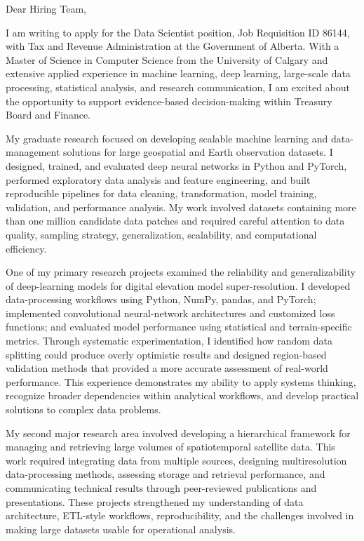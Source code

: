 \documentclass[11pt]{letter}
\begin{document}
\begin{letter}{}

\opening{Dear Hiring Team,}

I am writing to apply for the Data Scientist position, Job Requisition ID 86144, with Tax and Revenue Administration at the Government of Alberta. With a Master of Science in Computer Science from the University of Calgary and extensive applied experience in machine learning, deep learning, large-scale data processing, statistical analysis, and research communication, I am excited about the opportunity to support evidence-based decision-making within Treasury Board and Finance.

My graduate research focused on developing scalable machine learning and data-management solutions for large geospatial and Earth observation datasets. I designed, trained, and evaluated deep neural networks in Python and PyTorch, performed exploratory data analysis and feature engineering, and built reproducible pipelines for data cleaning, transformation, model training, validation, and performance analysis. My work involved datasets containing more than one million candidate data patches and required careful attention to data quality, sampling strategy, generalization, scalability, and computational efficiency.

One of my primary research projects examined the reliability and generalizability of deep-learning models for digital elevation model super-resolution. I developed data-processing workflows using Python, NumPy, pandas, and PyTorch; implemented convolutional neural-network architectures and customized loss functions; and evaluated model performance using statistical and terrain-specific metrics. Through systematic experimentation, I identified how random data splitting could produce overly optimistic results and designed region-based validation methods that provided a more accurate assessment of real-world performance. This experience demonstrates my ability to apply systems thinking, recognize broader dependencies within analytical workflows, and develop practical solutions to complex data problems.

My second major research area involved developing a hierarchical framework for managing and retrieving large volumes of spatiotemporal satellite data. This work required integrating data from multiple sources, designing multiresolution data-processing methods, assessing storage and retrieval performance, and communicating technical results through peer-reviewed publications and presentations. These projects strengthened my understanding of data architecture, ETL-style workflows, reproducibility, and the challenges involved in making large datasets usable for operational analysis.


\end{letter}
\end{document}
